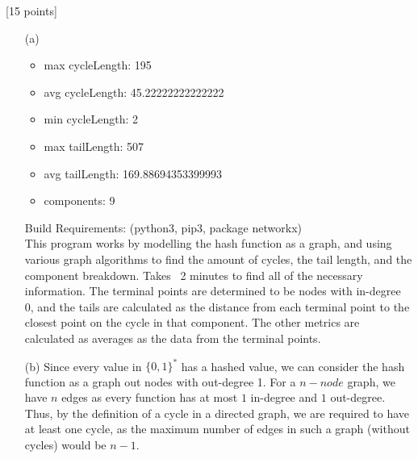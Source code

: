 \documentclass[11pt]{article}
\newcounter{qnum}
\newcommand{\question}[1]{\stepcounter{qnum}\bigskip\noindent{\bf \arabic{qnum}. #1.}}
\begin{document}
\question{Hash cycles} [15 points]
\begin{itemize}
\item[(a)]
  \begin{itemize}
    \item max cycleLength:  195
    \item avg cycleLength:  45.22222222222222
    \item min cycleLength:  2
    \item max tailLength:  507
    \item avg tailLength:  169.88694353399993
    \item components:  9
  \end{itemize}
  Build Requirements: (python3, pip3, package networkx)
  \\
  This program works by modelling the hash function as a graph, and using various graph 
  algorithms to find the amount of cycles, the tail length, and the component breakdown.
  Takes ~2 minutes to find all of the necessary information. The terminal points are determined
  to be nodes with in-degree 0, and the tails are calculated as the distance from each terminal
  point to the closest point on the cycle in that component. The other metrics are calculated
  as averages as the data from the terminal points.
\item[(b)] Since every value in $\{0, 1\}^*$ has a hashed value, we can consider the hash 
  function as a graph out nodes with out-degree 1. For a $n-node$ graph, we have $n$ edges
  as every function has at most $1$ in-degree and $1$ out-degree. Thus, by the definition of
  a cycle in a directed graph, we are required to have at least one cycle, as the maximum number
  of edges in such a graph (without cycles) would be $n-1$.

\end{itemize}
\end{document}
